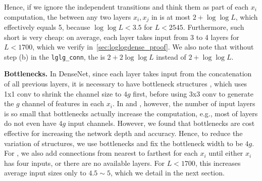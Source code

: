Hence, if we ignore the independent transitions and think them as part of each $x_i$ computation, the \pbd between any two layers $x_i, x_j$ in \loglogdense is at most $2 + \log\log L$, which effectively equals 5, because  $\log\log L < 3.5$ for $L < 2545$. Furthermore, such short \pbd is very cheap: on average, each layer takes input from 3 to 4 layers for $L < 1700$, which we verify in~\ref{sec:loglogdense_proof}. We also note that without step (b) in the \verb=lglg_conn=, the \pbd is $2+ 2\log \log L$ instead of $2 + \log \log L$.


\textbf{Bottlenecks.} 
In DenseNet, since each layer takes input from the concatenation of all previous layers, it is necessary to have bottleneck structures \citep{resnet, densenet}, which uses 1x1 conv to shrink the channel size to $4g$ first, before using 3x3 conv to generate the $g$ channel of features in each $x_i$. In \logdense and \loglogdense, however, the number of input layers is so small that bottlenecks actually increase the computation, e.g., most of \loglogdense layers do not even have $4g$ input channels. However, we found that bottlenecks are cost effective for increasing the network depth and accuracy. Hence, to reduce the variation of structures, we use bottlenecks and fix the bottleneck width to be $4g$. For \loglogdense, we also add \logdense connections from nearest to farthest for each $x_i$ until either $x_i$ has four inputs, or there are no available layers. For $L<1700$, this increases average input sizes only to $4.5 \sim 5$, which we detail in the next section. 
